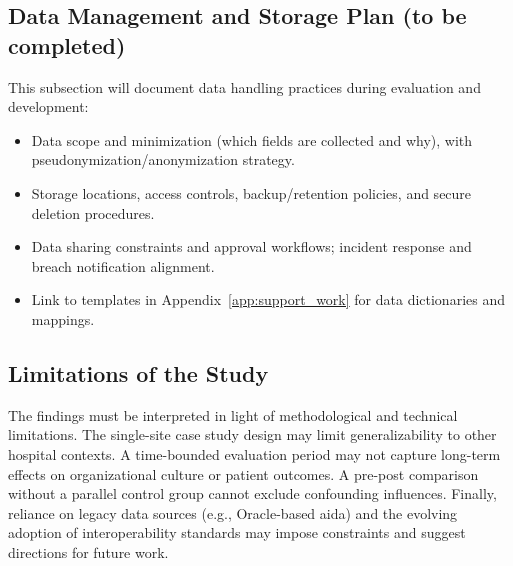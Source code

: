 \subsection{Data Management and Storage Plan (to be completed)}
This subsection will document data handling practices during evaluation and development:
\begin{itemize}
    \item Data scope and minimization (which fields are collected and why), with pseudonymization/anonymization strategy.
    \item Storage locations, access controls, backup/retention policies, and secure deletion procedures.
    \item Data sharing constraints and approval workflows; incident response and breach notification alignment.
    \item Link to templates in Appendix~\ref{app:support_work} for data dictionaries and mappings.
\end{itemize}

\subsection{Limitations of the Study}
The findings must be interpreted in light of methodological and technical limitations. The single-site case study design may limit generalizability to other hospital contexts. A time-bounded evaluation period may not capture long-term effects on organizational culture or patient outcomes. A pre-post comparison without a parallel control group cannot exclude confounding influences. Finally, reliance on legacy data sources (e.g., Oracle-based \gls{aida}) and the evolving adoption of interoperability standards may impose constraints and suggest directions for future work.


